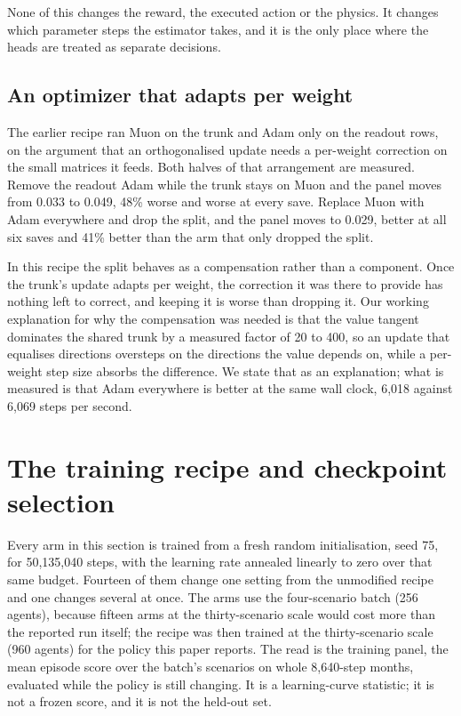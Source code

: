 \documentclass{article}
\begin{document}
None of this changes the reward, the executed action or the physics. It changes which parameter steps the estimator takes, and it is the only place where the heads are treated as separate decisions.

\subsection{An optimizer that adapts per weight}
\label{app:adam}

The earlier recipe ran Muon on the trunk and Adam only on the readout rows, on the argument that an orthogonalised update needs a per-weight correction on the small matrices it feeds. Both halves of that arrangement are measured. Remove the readout Adam while the trunk stays on Muon and the panel moves from 0.033 to 0.049, 48\% worse and worse at every save. Replace Muon with Adam everywhere and drop the split, and the panel moves to 0.029, better at all six saves and 41\% better than the arm that only dropped the split.

In this recipe the split behaves as a compensation rather than a component. Once the trunk's update adapts per weight, the correction it was there to provide has nothing left to correct, and keeping it is worse than dropping it. Our working explanation for why the compensation was needed is that the value tangent dominates the shared trunk by a measured factor of 20 to 400, so an update that equalises directions oversteps on the directions the value depends on, while a per-weight step size absorbs the difference. We state that as an explanation; what is measured is that Adam everywhere is better at the same wall clock, 6{,}018 against 6{,}069 steps per second.

\section{The training recipe and checkpoint selection}
\label{app:recipe}

Every arm in this section is trained from a fresh random initialisation, seed 75, for 50{,}135{,}040 steps, with the learning rate annealed linearly to zero over that same budget. Fourteen of them change one setting from the unmodified recipe and one changes several at once. The arms use the four-scenario batch (256 agents), because fifteen arms at the thirty-scenario scale would cost more than the reported run itself; the recipe was then trained at the thirty-scenario scale (960 agents) for the policy this paper reports. The read is the training panel, the mean episode score over the batch's scenarios on whole 8{,}640-step months, evaluated while the policy is still changing. It is a learning-curve statistic; it is not a frozen score, and it is not the held-out set.
\end{document}
